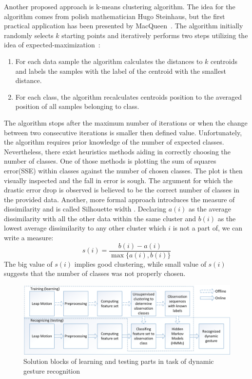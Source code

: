 Another proposed approach is k-means clustering algorithm.
The idea for the algorithm comes from polish mathematician Hugo Steinhaus, but the first practical application has been presented by MacQueen~\cite{kmeans2}.
The algorithm initially randomly selects $k$ starting points and iteratively performs two steps utilizing the idea of expected-maximization~\cite{expectedmaximization}:
\begin{enumerate}
\item For each data sample the algorithm calculates the distances to $k$ centroids and labels the samples with the label of the centroid with the smallest distance.
\item For each class, the algorithm recalculates centroids position to the averaged position of all samples belonging to class.
\end{enumerate} 
The algorithm stops after the maximum number of iterations or when the change between two consecutive iterations is smaller then defined value.
Unfortunately, the algorithm requires prior knowledge of the number of expected classes.
Nevertheless, there exist heuristics methods aiding in correctly choosing the number of classes. 
One of those methods is plotting the sum of squares error(SSE) within classes against the number of chosen classes. 
The plot is then visually inspected and the fall in error is sough.
The argument for which the drastic error drop is observed is believed to be the correct number of classes in the provided data.
Another, more formal approach introduces the measure of dissimilarity and is called Silhouette width \cite{silhouette}.
Declaring $a(i)$ as the average dissimilarity with all the other data within the same cluster and $b(i)$ as the lowest average dissimilarity to any other cluster which $i$ is not a part of, we can write a measure:
\begin{equation}
s(i) = \frac{b(i) - a(i)}{\max{\{a(i),b(i)}\}}
\end{equation}
The big value of $s(i)$ implies good clustering, while small value of $s(i)$ suggests that the number of classes was not properly chosen.





\begin{figure}[htb]
\centering
 \includegraphics[width=1\columnwidth]{figures/DynamicGestures.png}
 \caption{Solution blocks of learning and testing parts in task of dynamic gesture recognition}
 \label{dynamicgesturesflow}
\end{figure}

